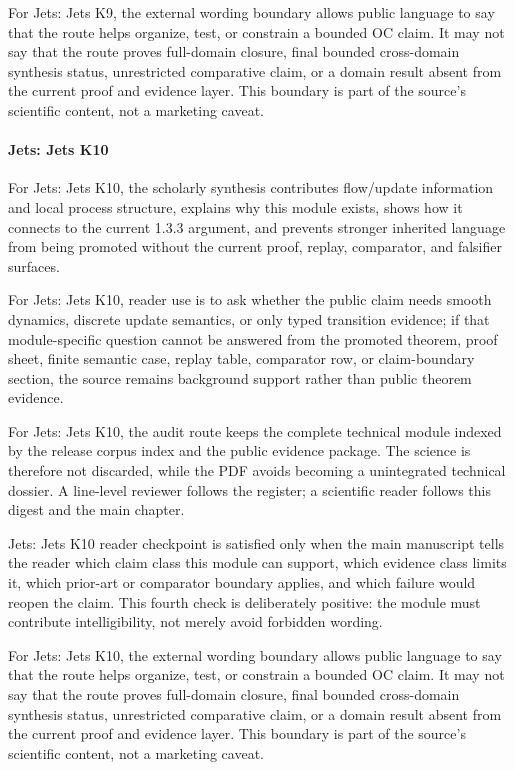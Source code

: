 For Jets: Jets K9, the external wording boundary allows public language to say that the route helps organize, test, or constrain a bounded OC claim. It may not say that the route proves full-domain closure, final bounded cross-domain synthesis status, unrestricted comparative claim, or a domain result absent from the current proof and evidence layer. This boundary is part of the source's scientific content, not a marketing caveat.


\paragraph{Jets: Jets K10}

For Jets: Jets K10, the scholarly synthesis contributes flow/update information and local process structure, explains why this module exists, shows how it connects to the current 1.3.3 argument, and prevents stronger inherited language from being promoted without the current proof, replay, comparator, and falsifier surfaces.


For Jets: Jets K10, reader use is to ask whether the public claim needs smooth dynamics, discrete update semantics, or only typed transition evidence; if that module-specific question cannot be answered from the promoted theorem, proof sheet, finite semantic case, replay table, comparator row, or claim-boundary section, the source remains background support rather than public theorem evidence.


For Jets: Jets K10, the audit route keeps the complete technical module indexed by the release corpus index and the public evidence package. The science is therefore not discarded, while the PDF avoids becoming a unintegrated technical dossier. A line-level reviewer follows the register; a scientific reader follows this digest and the main chapter.


Jets: Jets K10 reader checkpoint is satisfied only when the main manuscript tells the reader which claim class this module can support, which evidence class limits it, which prior-art or comparator boundary applies, and which failure would reopen the claim. This fourth check is deliberately positive: the module must contribute intelligibility, not merely avoid forbidden wording.


For Jets: Jets K10, the external wording boundary allows public language to say that the route helps organize, test, or constrain a bounded OC claim. It may not say that the route proves full-domain closure, final bounded cross-domain synthesis status, unrestricted comparative claim, or a domain result absent from the current proof and evidence layer. This boundary is part of the source's scientific content, not a marketing caveat.


